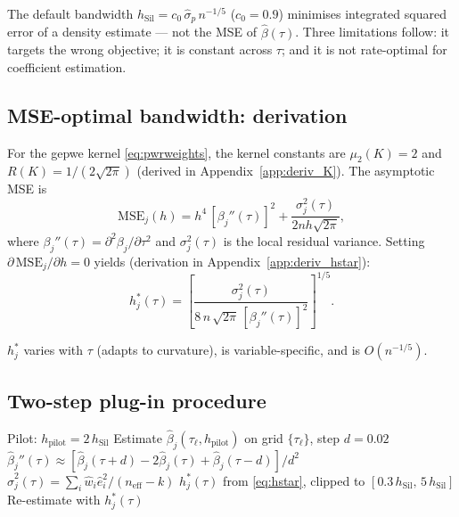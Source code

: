 \documentclass[12pt,a4paper]{article}
\theoremstyle{definition}
\newcommand{\hbeta}{\hat{\beta}}
\newcommand{\hw}{\hat{w}}
\begin{document}
The default bandwidth
$h_{\mathrm{Sil}} = c_0\,\hat\sigma_p\,n^{-1/5}$ ($c_0=0.9$)
minimises integrated squared error of a density estimate --- not the
MSE of $\hbeta(\tau)$. Three limitations follow: it targets the wrong
objective; it is constant across $\tau$; and it is not rate-optimal
for coefficient estimation.

\subsection{MSE-optimal bandwidth: derivation}

For the gepwe kernel \eqref{eq:pwrweights}, the kernel constants are
$\mu_2(K)=2$ and $R(K)=1/(2\sqrt{2\pi})$ (derived in
Appendix~\ref{app:deriv_K}). The asymptotic MSE is
\begin{equation}
  \mathrm{MSE}_j(h) =
  h^4\,[\beta_j''(\tau)]^2
  + \frac{\sigma_j^2(\tau)}{2nh\sqrt{2\pi}},
  \label{eq:mse}
\end{equation}
where $\beta_j''(\tau)=\partial^2\beta_j/\partial\tau^2$ and
$\sigma_j^2(\tau)$ is the local residual variance. Setting
$\partial\,\mathrm{MSE}_j/\partial h=0$ yields (derivation in
Appendix~\ref{app:deriv_hstar}):
\begin{equation}
  \boxed{h_j^*(\tau) = \left[
    \frac{\sigma_j^2(\tau)}{8\,n\,\sqrt{2\pi}\,[\beta_j''(\tau)]^2}
  \right]^{1/5}.}
  \label{eq:hstar}
\end{equation}

$h_j^*$ varies with $\tau$ (adapts to curvature), is
variable-specific, and is $O(n^{-1/5})$.

\subsection{Two-step plug-in procedure}

\begin{algorithm}[H]
\caption{MSE-optimal bandwidth (two-step plug-in)}
\begin{algorithmic}[1]
\State Pilot: $h_{\mathrm{pilot}} = 2\,h_{\mathrm{Sil}}$
\State Estimate $\hat\beta_j(\tau_\ell,h_{\mathrm{pilot}})$ on grid
$\{\tau_\ell\}$, step $d=0.02$
\State $\hat\beta_j''(\tau)\approx[\hat\beta_j(\tau+d)-2\hat\beta_j(\tau)
+\hat\beta_j(\tau-d)]/d^2$
\State $\hat\sigma_j^2(\tau)=\sum_i\hw_i\hat{e}_i^2/(n_{\mathrm{eff}}-k)$
\State $h_j^*(\tau)$ from \eqref{eq:hstar}, clipped to
$[0.3\,h_{\mathrm{Sil}},\,5\,h_{\mathrm{Sil}}]$
\State Re-estimate with $h_j^*(\tau)$
\end{algorithmic}
\end{algorithm}
\end{document}
